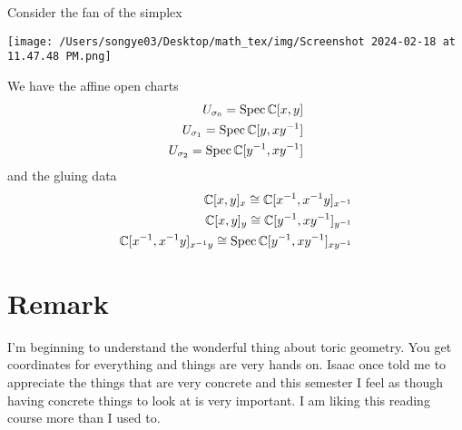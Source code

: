 \documentclass[12pt]{article}
\begin{document}
\begin{example}
    Consider the fan of the simplex \begin{center}
        \texttt{[image: /Users/songye03/Desktop/math\_tex/img/Screenshot 2024-02-18 at 11.47.48 PM.png]}
    \end{center} 
    We have the affine open charts 
    \begin{align*}
        U_{\sigma_0} = \operatorname{Spec} \mathbb{C}[x,y] \\
        U_{\sigma_1} = \operatorname{Spec} \mathbb{C}[y,{xy}^{-1}] \\
        U_{\sigma_2} = \operatorname{Spec} \mathbb{C}[{y}^{-1},x{y}^{-1}]
    \end{align*} and the gluing data 
    \begin{align*}
        \mathbb{C}[x,y]_{x} \cong \mathbb{C}[x^{-1},{x}^{-1}y]_{{x}^{-1}} \\
        \mathbb{C}[x,y]_{y} \cong \mathbb{C}[y^{-1},x{y}^{-1}]_{{y}^{-1}}\\
        \mathbb{C}[{x}^{-1},{x}^{-1}y]_{{x}^{-1}y} \cong  \operatorname{Spec} \mathbb{C}[{y}^{-1},x{y}^{-1}]_{x{y}^{-1}}
    \end{align*}
\end{example}

\section{Remark}
I'm beginning to understand the wonderful thing about toric geometry. You get coordinates for everything and things are very hands on.
Isaac once told me to appreciate the things that are very concrete and this semester I feel as though
having concrete things to look at is very important. I am liking this reading course more than I used to.
\end{document}
